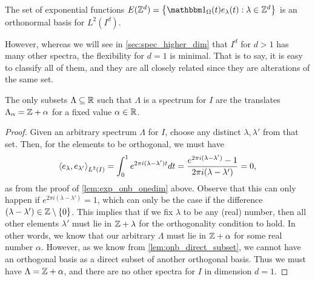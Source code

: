 \documentclass[../thesis.tex]{subfiles}
\begin{document}
\begin{theorem}\label{lem:z_d_in_higer_d}
    The set of exponential functions $E(\Z^d) = \braqMed{\indicator{\Omega}{t} e_\lambda(t) : \lambda \in \Z^d}$ is an orthonormal basis for $L^2(I^d)$.
\end{theorem}
However, whereas we will see in \cref{sec:spec_higher_dim} that $I^d$ for $d>1$ has many other spectra, the flexibility for $d=1$ is minimal. That is to say, it is easy to classify all of them, and they are all closely related since they are alterations of the same set.  %
\begin{proposition}\label{prop:class_all_shift}
    The only subsets $\Lambda \subseteq \mathbb{R}$ such that $\Lambda$ is a spectrum for $I$ are the translates $\Lambda_\alpha = \mathbb{Z} + \alpha$ for a fixed value $\alpha \in \mathbb{R}$.
\end{proposition}
\begin{proof} %
    Given an arbitrary spectrum $\Lambda$ for $I$, choose any distinct $\lambda,\lambda'$ from that set. Then, for the elements to be orthogonal, we must have
    \begin{equation}\label{eq:zero_set_equation}
        \left \langle e_{\lambda},e_{\lambda'}  \right \rangle_{L^2(I)} = \int_0^1 e^{2 \pi i (\lambda-\lambda')t} dt =\frac{e^{2 \pi i (\lambda - \lambda')} -1}{2 \pi i (\lambda-\lambda')} = 0,
    \end{equation}
    as from the proof of \cref{lem:exp_onb_onedim} above. Observe that this can only happen if $e^{2\pi i (\lambda-\lambda')} = 1$, which can only be the case if the difference $(\lambda-\lambda') \in \mathbb{Z}\setminus\{0\}$. This implies that if we fix $\lambda$ to be any (real) number, then all other elements $\lambda'$ must lie in $\mathbb{Z} + \lambda$ for the orthogonality condition to hold. In other words, we know that our arbitrary $\Lambda$ must lie in $\mathbb{Z}+\alpha$ for some real number $\alpha$. However, as we know from \cref{lem:onb_direct_subset}, we cannot have an orthogonal basis as a direct subset of another orthogonal basis. Thus we must have $\Lambda = \mathbb{Z}+\alpha$, and there are no other spectra for $I$ in dimension $d=1$.
\end{proof} %
\end{document}
